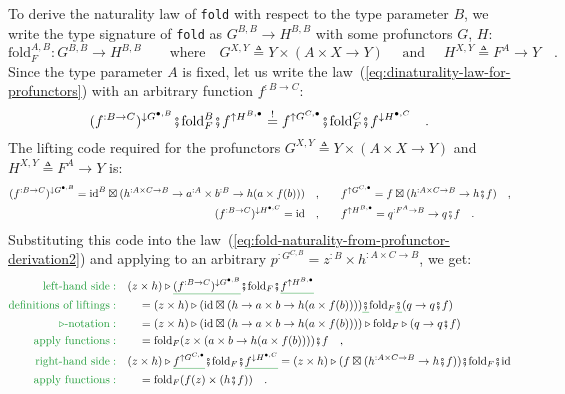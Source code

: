 To derive the naturality law of \lstinline!fold! with respect to
the type parameter $B$, we write the type signature of \lstinline!fold!
as $G^{B,B}\rightarrow H^{B,B}$ with some profunctors $G$, $H$:
\[
\text{fold}_{F}^{A,B}:G^{B,B}\rightarrow H^{B,B}\quad\quad\text{where}\quad G^{X,Y}\triangleq Y\times(A\times X\rightarrow Y)\quad\text{ and }\quad H^{X,Y}\triangleq F^{A}\rightarrow Y\quad.
\]
Since the type parameter $A$ is fixed, let us write the law~(\ref{eq:dinaturality-law-for-profunctors})
with an arbitrary function $f^{:B\rightarrow C}$:
\begin{equation}
(f^{:B\rightarrow C})^{\downarrow G^{\bullet,B}}\bef\text{fold}_{F}^{B}\bef f^{\uparrow H^{B,\bullet}}\overset{!}{=}f^{\uparrow G^{C,\bullet}}\bef\text{fold}_{F}^{C}\bef f^{\downarrow H^{\bullet,C}}\quad.\label{eq:fold-naturality-from-profunctor-derivation2}
\end{equation}
The lifting code required for the profunctors $G^{X,Y}\triangleq Y\times\left(A\times X\rightarrow Y\right)$
and $H^{X,Y}\triangleq F^{A}\rightarrow Y$ is:
\begin{align*}
(f^{:B\rightarrow C})^{\downarrow G^{\bullet,B}}=\text{id}^{B}\boxtimes(h^{:A\times C\rightarrow B}\rightarrow a^{:A}\times b^{:B}\rightarrow h(a\times f(b)))\quad, & \quad\quad f^{\uparrow G^{C,\bullet}}=f\boxtimes(h^{:A\times C\rightarrow B}\rightarrow h\bef f)\quad,\\
(f^{:B\rightarrow C})^{\downarrow H^{\bullet,C}}=\text{id}\quad, & \quad\quad f^{\uparrow H^{B,\bullet}}=q^{:F^{A}\rightarrow B}\rightarrow q\bef f\quad.
\end{align*}
Substituting this code into the law~(\ref{eq:fold-naturality-from-profunctor-derivation2})
and applying to an arbitrary $p^{:G^{C,B}}=z^{:B}\times h^{:A\times C\rightarrow B}$,
we get:
\begin{align*}
{\color{greenunder}\text{left-hand side}:}\quad & (z\times h)\triangleright\gunderline{(f^{:B\rightarrow C})^{\downarrow G^{\bullet,B}}}\bef\text{fold}_{F}\bef\gunderline{f^{\uparrow H^{B,\bullet}}}\\
{\color{greenunder}\text{definitions of liftings}:}\quad & \quad=(z\times h)\triangleright(\text{id}\boxtimes(h\rightarrow a\times b\rightarrow h(a\times f(b))))\gunderline{\bef}\text{fold}_{F}\gunderline{\bef}(q\rightarrow q\bef f)\\
{\color{greenunder}\triangleright\text{-notation}:}\quad & \quad=(z\times h)\triangleright(\text{id}\boxtimes(h\rightarrow a\times b\rightarrow h(a\times f(b))))\triangleright\text{fold}_{F}\triangleright(q\rightarrow q\bef f)\\
{\color{greenunder}\text{apply functions}:}\quad & \quad=\text{fold}_{F}(z\times(a\times b\rightarrow h(a\times f(b))))\bef f\quad,\\
{\color{greenunder}\text{right-hand side}:}\quad & (z\times h)\triangleright\gunderline{f^{\uparrow G^{C,\bullet}}}\bef\text{fold}_{F}\bef\gunderline{f^{\downarrow H^{\bullet,C}}}=(z\times h)\triangleright(f\boxtimes(h^{:A\times C\rightarrow B}\rightarrow h\bef f))\bef\text{fold}_{F}\bef\text{id}\\
{\color{greenunder}\text{apply functions}:}\quad & \quad=\text{fold}_{F}(f(z)\times(h\bef f))\quad.
\end{align*}
